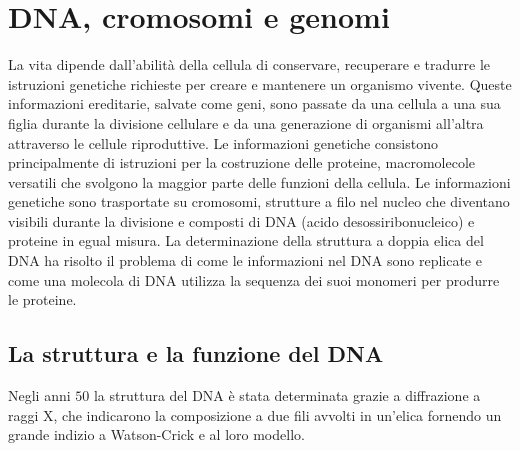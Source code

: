 \chapter{DNA, cromosomi e genomi}
La vita dipende dall'abilit\`a della cellula di conservare, recuperare e tradurre le istruzioni genetiche richieste per creare e mantenere un organismo vivente. Queste informazioni
ereditarie, salvate come geni, sono passate da una cellula a una sua figlia durante la divisione cellulare e da una generazione di organismi all'altra attraverso le cellule riproduttive.
Le informazioni genetiche consistono principalmente di istruzioni per la costruzione delle proteine, macromolecole versatili che svolgono la maggior parte delle funzioni della 
cellula. Le informazioni genetiche sono trasportate su cromosomi, strutture a filo nel nucleo che diventano visibili durante la divisione e composti di DNA (acido desossiribonucleico) e 
proteine in egual misura. La determinazione della struttura a doppia elica del DNA ha risolto il problema di come le informazioni nel DNA sono replicate e come una molecola di DNA 
utilizza la sequenza dei suoi monomeri per produrre le proteine.
\section{La struttura e la funzione del DNA}
Negli anni $50$ la struttura del DNA \`e stata determinata grazie a diffrazione a raggi X, che indicarono la composizione a due fili avvolti in un'elica fornendo un grande indizio a
Watson-Crick e al loro modello.
